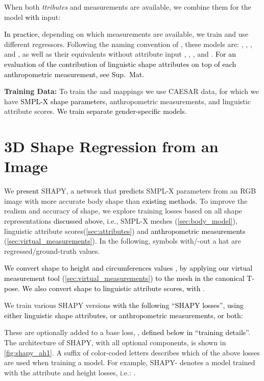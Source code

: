 \documentclass[10pt,twocolumn,letterpaper]{article}
\newcommand{\zheading}[1]{\textbf{#1:}}
\newcommand{\TODO}[1]{\xspace{\color{red} #1}\xspace}
\renewcommand{\TODO}[1]{\xspace{\color{black} #1}\xspace}
\newcommand{\modelCOLOR}{black}
\newcommand{\modelname}{{\color{\modelCOLOR}SHAPY}\xspace}
\newcommand{\colorattr}{\color{PineGreen}}
\newcommand{\colorheight}{\color{Bittersweet}}
\newcommand{\colorweight}{\color{Orange}}
\newcommand{\colorcirc}{\color{OrangeRed}}
\newcommand{\colorAFMtoS}{\text{\mbox{{\colorattr{A}}{\colorheight{H}}{\colorweight{W}}{\colorcirc{C}}2S}}\xspace}
\newcommand{\colorAHWtoS}{\text{\mbox{{\colorattr{A}}{\colorheight{H}}{\colorweight{W}}2S}}\xspace}
\newcommand{\colorAHCtoS}{\text{\mbox{{\colorattr{A}}{\colorheight{H}}{\colorcirc{C}}2S}}\xspace}
\newcommand{\colorAHtoS}{\text{\mbox{{\colorattr{A}}{\colorheight{H}}2S}}\xspace}
\newcommand{\colorAH}{\text{\mbox{{\colorattr{A}}{\colorheight{H}}}}\xspace}
\newcommand{\colorACtoS}{\text{\mbox{{\colorattr{A}}{\colorcirc{C}}2S}}\xspace}
\newcommand{\colorHWtoS}{\text{\mbox{{\colorheight{H}}{\colorweight{W}}2S}}\xspace}
\newcommand{\colorHCtoS}{\text{\mbox{{\colorheight{H}}{\colorcirc{C}}2S}}\xspace}
\newcommand{\colorHtoS}{\text{\mbox{{\colorheight{H}}2S}}\xspace}
\newcommand{\colorCtoS}{\text{\mbox{{\colorcirc{C}}2S}}\xspace}
\newcommand{\AtoS}{\text{\mbox{A2S}}\xspace}
\newcommand{\StoA}{\text{\mbox{S2A}}\xspace}
\newcommand{\threeD}{3D\xspace}
\newcommand{\smplx}{\mbox{SMPL-X}\xspace}
\newcommand{\smplX}{\smplx}
\newcommand{\groundtruth}{\mbox{ground-truth}\xspace}
\newcommand{\caesar}{\mbox{CAESAR}\xspace}
\newcommand{\supmat}{{\mbox{\textcolor{black}{Sup.~Mat.}}}\xspace}
\renewcommand{\ie}{\mbox{i.e.}\xspace}
\newcommand{\rgb}{\mbox{RGB}\xspace}
\newcommand{\cameraready}[1]{\textcolor{Fuchsia}{{#1}}\xspace}
\renewcommand{\cameraready}[1]{\textcolor{black}{{#1}}\xspace}
\newcommand{\colorTERM}{blue}
\renewcommand{\colorTERM}{black}
\newcommand{\measurement}[0]{{\color{\colorTERM}anthropometric measurement}\xspace}
\newcommand{\measurements}[0]{{\color{\colorTERM}anthropometric measurements}\xspace}
\newcommand{\linguisticshapeattributes}[0]{{\color{\colorTERM}linguistic shape attributes}\xspace}
\newcommand{\scores}[0]{{scores}\xspace}
\newcommand{\linguisticattributescores}[0]{{\color{\colorTERM}linguistic attribute \scores}\xspace}
\begin{document}
When both \textit{{\colorattr{A}}ttributes} and measurements are available, we combine them 
for the \colorAFMtoS model \cameraready{with} input: 


\cameraready{In practice,} 
depending on which measurements are available, we train and use different regressors.
Following the naming convention of \colorAFMtoS, these models are: \colorAHtoS, \colorAHWtoS, \colorACtoS, and \colorAHCtoS, as well as their equivalents without attribute input \colorHtoS, \colorHWtoS, \colorCtoS, and \colorHCtoS.
\cameraready{For an evaluation of the contribution of \linguisticshapeattributes on top of each \measurement, see  \supmat}


\zheading{Training Data}
To train the \AtoS and \StoA mappings we use \caesar data, for which we have 
\cameraready{\smplX shape parameters,} 
\measurements, and \linguisticattributescores.
\cameraready{We train separate gender-specific models.}





 \section{\threeD Shape Regression from an Image}     \label{sec:regressor}

We 
\cameraready{present}
\modelname, a network that \cameraready{predicts}
\smplx parameters from an \rgb image with more accurate body shape than 
\cameraready{existing methods}. 
To improve the realism and accuracy of shape, we explore training losses based on
all shape representations
\cameraready{discussed above}, \ie, 
\smplX meshes (\cref{sec:body_model}),
\linguisticattributescores (\cref{sec:attributes}) and 
\cameraready{\measurements} (\cref{sec:virtual_measurements}).
In the following, symbols with/-out a hat are regressed/\groundtruth values. 

\cameraready{We convert shape 
to height and circumferences values
 ,
by applying our 
virtual measurement tool 
(\cref{sec:virtual_measurements})
to
the
mesh  in the canonical T-pose.} 
\cameraready{We also convert shape 
 to \linguisticattributescores, with}
\TODO{}.


We train various \modelname versions \cameraready{with the following \cameraready{``\modelname losses''}, using either \linguisticshapeattributes, or \measurements, or both:}
{\small

}
These are optionally added to a base loss, , \cameraready{defined below in ``training details''}.
The architecture of \modelname, with all optional components, is shown in \cref{fig:shapy_ah1}.
A suffix of color-coded letters describes which of the above losses
are used when training a model.
For example, \mbox{\modelname-\colorAH} 
denotes a model trained with the attribute and height losses,
{\ie}: 
\mbox{.}
\end{document}
